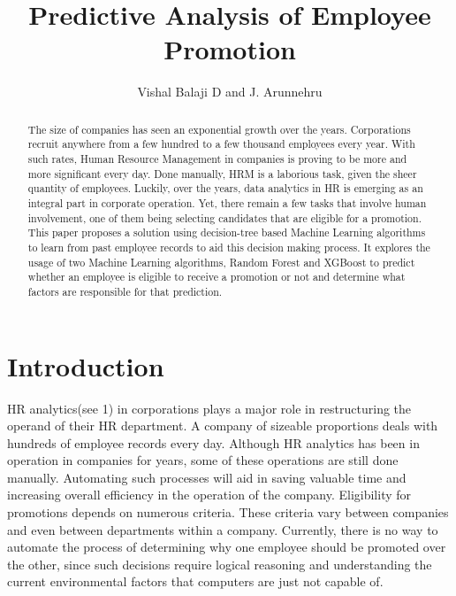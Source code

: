 \documentclass[runningheads]{llncs}
\institute{\textsuperscript{1} Department of Computer Science and
Engineering, SRM Institute of Science and Technology, Vadapalani Campus,
Chennai - 26, \\ \texttt{\{vishalbalaji,arunnehru.aucse\}@gmail.com}}
\title{Predictive Analysis of Employee Promotion}
\author{Vishal Balaji D\inst{1}\orcidID{0000-1111-2222-3333} and J.
Arunnehru\inst{1}\orcidID{1111-2222-3333-4444}}
\date{}
\begin{document}
\maketitle
\begin{abstract}
The size of companies has seen an exponential growth over the years.
Corporations recruit anywhere from a few hundred to a few thousand
employees every year. With such rates, Human Resource Management in
companies is proving to be more and more significant every day. Done
manually, HRM is a laborious task, given the sheer quantity of
employees. Luckily, over the years, data analytics in HR is emerging as
an integral part in corporate operation. Yet, there remain a few tasks
that involve human involvement, one of them being selecting candidates
that are eligible for a promotion. This paper proposes a solution using
decision-tree based Machine Learning algorithms to learn from past
employee records to aid this decision making process. It explores the
usage of two Machine Learning algorithms, Random Forest and XGBoost to
predict whether an employee is eligible to receive a promotion or not
and determine what factors are responsible for that prediction.


\end{abstract}

\hypertarget{introduction}{%
\section{Introduction}\label{introduction}}

HR analytics(see \cite{ref-Quddus2019}{1}) in
corporations plays a major role in restructuring the operand of their HR
department. A company of sizeable proportions deals with hundreds of
employee records every day. Although HR analytics has been in operation
in companies for years, some of these operations are still done
manually. Automating such processes will aid in saving valuable time and
increasing overall efficiency in the operation of the company.
Eligibility for promotions depends on numerous criteria. These criteria
vary between companies and even between departments within a company.
Currently, there is no way to automate the process of determining why
one employee should be promoted over the other, since such decisions
require logical reasoning and understanding the current environmental
factors that computers are just not capable of.
\end{document}
